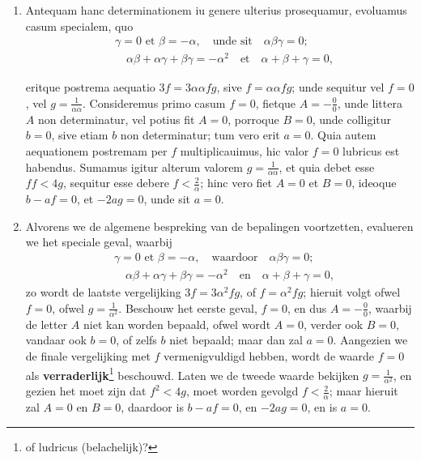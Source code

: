 \documentclass[10pt,a4paper]{article}
\newcommand{\switchenum}{\setcounter{enumi}{\arabic{enumi}-1}\switchcolumn}
\begin{document}
\begin{paracol}{2}
\begin{enumerate}[topsep=1px]
		\item Antequam hanc determinationem iu genere ulterius prosequamur, evoluamus casum specialem, quo 
		\begin{align*}
			&\gamma = 0 \text{ et } \beta = -\alpha, \quad \text{unde sit} \quad \alpha\beta\gamma = 0;\\
			&\quad \alpha\beta+\alpha \gamma+\beta \gamma = -\alpha^2 \quad \text{et} \quad \alpha+\beta+ \gamma = 0,
		\end{align*}
		\par eritque postrema aequatio $3f = 3\alpha \alpha f g$, sive $f=\alpha \alpha fg$; unde sequitur vel $f= 0$, vel $g= \frac{1}{\alpha \alpha}$. Consideremus primo casum $f=0$, fietque $A = -\frac{0}{0}$, unde littera $A$ non determinatur, vel potius fit $A = 0$, porroque $B=0$, unde colligitur $b=0$, sive etiam $b$ non determinatur; tum vero erit $a=0$. Quia autem aequationem postremam per $f$ multiplicauimus, hic valor $f=0$ lubricus est habendus. Sumamus igitur alterum valorem $g= \frac{1}{\alpha \alpha}$, et quia debet esse $ff<4g$, sequitur esse debere $f< \frac{2}{\alpha}$; hinc vero fiet $A=0$ et $B=0$, ideoque $b-af = 0$, et $-2ag = 0$, unde sit $a = 0$.
		
		\switchenum
			\item Alvorens we de algemene bespreking van de bepalingen voortzetten, evalueren we het speciale geval, waarbij
		\begin{align*}
			&\gamma = 0 \text{ et } \beta = -\alpha, \quad \text{waardoor} \quad \alpha\beta\gamma = 0;\\
			&\quad \alpha\beta+\alpha \gamma+\beta \gamma = -\alpha^2 \quad \text{en} \quad \alpha+\beta+ \gamma = 0,
		\end{align*}
		zo wordt de laatste vergelijking  $3f = 3\alpha^2 f g$,  of $f=\alpha^2 fg$; hieruit volgt ofwel $f=0$, ofwel $g=\frac{1}{\alpha^2}$. Beschouw het eerste geval, $f=0$, en dus $A = -\frac{0}{0}$, waarbij de letter $A$ niet kan worden bepaald, ofwel wordt $A=0$, verder ook $B=0$, vandaar ook $b=0$, of zelfs $b$ niet bepaald;  maar dan zal $a=0$. Aangezien we de finale vergelijking met $f$ vermenigvuldigd hebben, wordt de waarde $f=0$ als \textbf{verraderlijk}\footnote{of ludricus (belachelijk)?} beschouwd. Laten we de tweede waarde bekijken $g=\frac{1}{\alpha^2}$, en gezien het moet zijn dat $f^2<4g$, moet worden gevolgd $f< \frac{2}{\alpha}$; maar hieruit zal $A=0$ en $B=0$, daardoor is $b-af=0$, en $-2a g = 0$, en is $a=0$.

		\switchcolumn*
		

\end{enumerate}
\end{paracol}
\end{document}
